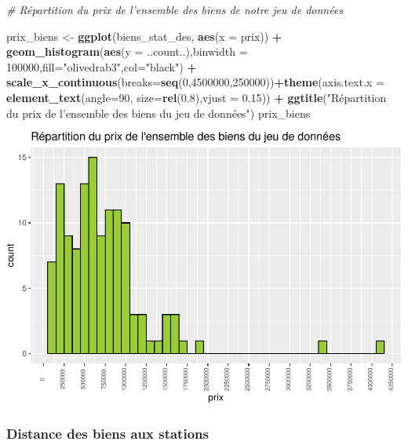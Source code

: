 \documentclass[french,]{article}
\newenvironment{Shaded}{\begin{snugshade}}{\end{snugshade}}
\newcommand{\CommentTok}[1]{\textcolor[rgb]{0.56,0.35,0.01}{\textit{#1}}}
\newcommand{\DataTypeTok}[1]{\textcolor[rgb]{0.13,0.29,0.53}{#1}}
\newcommand{\DecValTok}[1]{\textcolor[rgb]{0.00,0.00,0.81}{#1}}
\newcommand{\FloatTok}[1]{\textcolor[rgb]{0.00,0.00,0.81}{#1}}
\newcommand{\KeywordTok}[1]{\textcolor[rgb]{0.13,0.29,0.53}{\textbf{#1}}}
\newcommand{\NormalTok}[1]{#1}
\newcommand{\OperatorTok}[1]{\textcolor[rgb]{0.81,0.36,0.00}{\textbf{#1}}}
\newcommand{\StringTok}[1]{\textcolor[rgb]{0.31,0.60,0.02}{#1}}
\begin{document}
\begin{Shaded}
\begin{Highlighting}[]
\CommentTok{# Répartition du prix de l'ensemble des biens de notre jeu de données}

\NormalTok{prix_biens <-}\StringTok{ }\KeywordTok{ggplot}\NormalTok{(biens_stat_des, }\KeywordTok{aes}\NormalTok{(}\DataTypeTok{x =}\NormalTok{ prix)) }\OperatorTok{+}
\StringTok{        }\KeywordTok{geom_histogram}\NormalTok{(}\KeywordTok{aes}\NormalTok{(}\DataTypeTok{y =}\NormalTok{ ..count..),}\DataTypeTok{binwidth =} \DecValTok{100000}\NormalTok{,}\DataTypeTok{fill=}\StringTok{"olivedrab3"}\NormalTok{,}\DataTypeTok{col=}\StringTok{"black"}\NormalTok{) }\OperatorTok{+}
\StringTok{        }\KeywordTok{scale_x_continuous}\NormalTok{(}\DataTypeTok{breaks=}\KeywordTok{seq}\NormalTok{(}\DecValTok{0}\NormalTok{,}\DecValTok{4500000}\NormalTok{,}\DecValTok{250000}\NormalTok{))}\OperatorTok{+}\KeywordTok{theme}\NormalTok{(}\DataTypeTok{axis.text.x =} \KeywordTok{element_text}\NormalTok{(}\DataTypeTok{angle=}\DecValTok{90}\NormalTok{, }\DataTypeTok{size=}\KeywordTok{rel}\NormalTok{(}\FloatTok{0.8}\NormalTok{),}\DataTypeTok{vjust =} \FloatTok{0.15}\NormalTok{)) }\OperatorTok{+}\StringTok{ }\KeywordTok{ggtitle}\NormalTok{(}\StringTok{"Répartition du prix de l'ensemble des biens du jeu de données"}\NormalTok{)}
\NormalTok{prix_biens}
\end{Highlighting}
\end{Shaded}

\includegraphics{Projet_files/figure-latex/unnamed-chunk-21-1.pdf}

\hypertarget{distance-des-biens-aux-stations}{%
\subsubsection{Distance des biens aux
stations}\label{distance-des-biens-aux-stations}}
\end{document}
